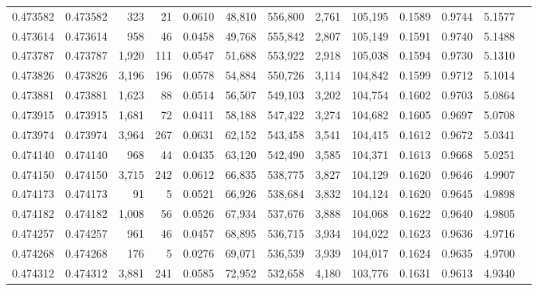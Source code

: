 \begin{tabular}{rrrrrrrrrrrrr}
0.473582 & 0.473582 &   323 &    21 &                                     0.0610 &  48,810 & 556,800 &   2,761 & 105,195 & 0.1589 & 0.9744 & 5.1577 \\
0.473614 & 0.473614 &   958 &    46 &                                     0.0458 &  49,768 & 555,842 &   2,807 & 105,149 & 0.1591 & 0.9740 & 5.1488 \\
0.473787 & 0.473787 & 1,920 &   111 &                                     0.0547 &  51,688 & 553,922 &   2,918 & 105,038 & 0.1594 & 0.9730 & 5.1310 \\
0.473826 & 0.473826 & 3,196 &   196 &                                     0.0578 &  54,884 & 550,726 &   3,114 & 104,842 & 0.1599 & 0.9712 & 5.1014 \\
0.473881 & 0.473881 & 1,623 &    88 &                                     0.0514 &  56,507 & 549,103 &   3,202 & 104,754 & 0.1602 & 0.9703 & 5.0864 \\
0.473915 & 0.473915 & 1,681 &    72 &                                     0.0411 &  58,188 & 547,422 &   3,274 & 104,682 & 0.1605 & 0.9697 & 5.0708 \\
0.473974 & 0.473974 & 3,964 &   267 &                                     0.0631 &  62,152 & 543,458 &   3,541 & 104,415 & 0.1612 & 0.9672 & 5.0341 \\
0.474140 & 0.474140 &   968 &    44 &                                     0.0435 &  63,120 & 542,490 &   3,585 & 104,371 & 0.1613 & 0.9668 & 5.0251 \\
0.474150 & 0.474150 & 3,715 &   242 &                                     0.0612 &  66,835 & 538,775 &   3,827 & 104,129 & 0.1620 & 0.9646 & 4.9907 \\
0.474173 & 0.474173 &    91 &     5 &                                     0.0521 &  66,926 & 538,684 &   3,832 & 104,124 & 0.1620 & 0.9645 & 4.9898 \\
0.474182 & 0.474182 & 1,008 &    56 &                                     0.0526 &  67,934 & 537,676 &   3,888 & 104,068 & 0.1622 & 0.9640 & 4.9805 \\
0.474257 & 0.474257 &   961 &    46 &                                     0.0457 &  68,895 & 536,715 &   3,934 & 104,022 & 0.1623 & 0.9636 & 4.9716 \\
0.474268 & 0.474268 &   176 &     5 &                                     0.0276 &  69,071 & 536,539 &   3,939 & 104,017 & 0.1624 & 0.9635 & 4.9700 \\
0.474312 & 0.474312 & 3,881 &   241 &                                     0.0585 &  72,952 & 532,658 &   4,180 & 103,776 & 0.1631 & 0.9613 & 4.9340 \\

\end{tabular}
